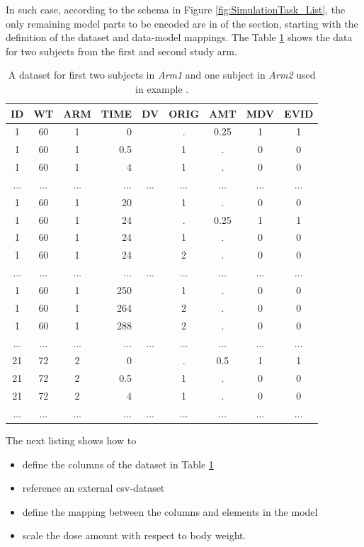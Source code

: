In such case, according to the schema in Figure \ref{fig:SimulationTask_List},
the only remaining model parts to be encoded are in 
of the  section, starting with the definition of the 
dataset and data-model mappings. The Table \ref{tab:example1_dataSet} shows
the data for two subjects from the first and second study arm.
\begin{table}[htdp]
\begin{center}
\small
\begin{tabular}{cccrccccc}\toprule
ID	& WT	& ARM	& TIME	& DV		& ORIG	& AMT	& MDV	& EVID \\\midrule
1	& 60		& 1		& 0		& 		& .		& 0.25	& 1		& 1 \\
1	& 60		& 1		& 0.5	& 		& 1		& .		& 0		& 0 \\
1	& 60		& 1		& 4		& 		& 1		& .		& 0		& 0 \\
... 	& ...		& ...		& ...		& ...		& ...		& ...		& ...		& ... \\
1	& 60		& 1		& 20		& 		& 1		& .		& 0		& 0 \\
1	& 60		& 1		& 24		& 		& .		& 0.25	& 1		& 1 \\
1	& 60		& 1		& 24		& 		& 1		& .		& 0		& 0 \\
1	& 60		& 1		& 24		&		& 2		& .		& 0		& 0 \\
... 	& ...		& ...		& ...		& ...		& ...		& ...		& ...		& ... \\
1	& 60		& 1		& 250	& 		& 1		& .		& 0		& 0 \\
1	& 60		& 1		& 264	& 		& 2		& .		& 0		& 0 \\
1	& 60		& 1		& 288	& 		& 2		& .		& 0		& 0 \\
... 	& ...		& ...		& ...		& ...		& ...		& ...		& ...		& ... \\
21	& 72		& 2		& 0		& 		& .		& 0.5	& 1		& 1 \\
21	& 72		& 2		& 0.5	& 		& 1		& .		& 0		& 0 \\
21	& 72		& 2		& 4		& 		& 1		& .		& 0		& 0 \\
...	& ...		& ...		& ...		& ...		&...		& ...		& ...		& ... \\ \bottomrule
\end{tabular}
\end{center}
\caption{A dataset for first two subjects in \emph{Arm1} and one subject in \emph{Arm2} 
used in example \theexamples.}
\label{tab:example1_dataSet}
\end{table}%
The next listing shows how to 
\begin{itemize}
\item
define the columns of the dataset in Table \ref{tab:example1_dataSet}
\item 
reference an external csv-dataset
\item
define the mapping between the columns and elements in the model
\item
scale the dose amount with respect to body weight.
\end{itemize}

